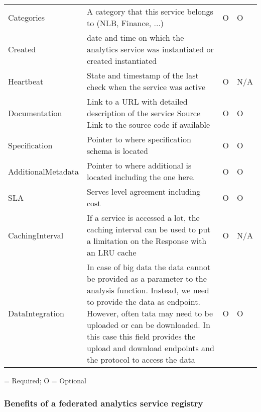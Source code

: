 \begin{table}[H]
{\begin{tabular}{p{3cm}p{11cm}p{0.5cm}p{0.5cm}}
Categories &	A category that this service belongs to (NLB, Finance, ...)	& O & O \\
Created	& date and time on which the analytics service was instantiated or created	instantiated	& \OK & \OK \\
Heartbeat &	State and timestamp of the last check when the service was active	& O & 	N/A \\
Documentation &	Link to a URL with detailed description of the service
Source	Link to the source code if available	& O & O \\
Specification &	Pointer to where specification schema is located	& O &  O \\
AdditionalMetadata	& Pointer to where additional is located including the one here.	& O &	O \\
SLA	& Serves level agreement including cost	& O 	& O \\
CachingInterval	&If a service is accessed a lot, the caching interval can be used to put a limitation on the Response with an LRU cache	& O &	N/A \\
DataIntegration &	In case of big data the data cannot be provided as a parameter to the analysis function. Instead, we need to provide the data as endpoint. However, often tata may need to be uploaded or can be downloaded. In this case this field provides the upload and download endpoints and the protocol to access the data	& O &	O \\
\hline
\end{tabular}
}
\OK = Required; O = Optional
\end{table}

\subsubsection{Benefits of a federated analytics service registry}

